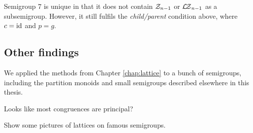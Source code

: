 Semigroup 7 is unique in that it does not contain $\mathcal{Z}_{n-1}$ or $\mathcal{L\!Z}_{n-1}$ as a
subsemigroup.  However, it still fulfils the \textit{child/parent} condition
above, where $c = \operatorname{id}$ and $p = g$.

\subsection{Other findings}
We applied the methods from Chapter \ref{chap:lattice} to a bunch of semigroups,
including the partition monoids and small semigroups described elsewhere in this
thesis.

Looks like most congruences are principal?

Show some pictures of lattices on famous semigroups.
